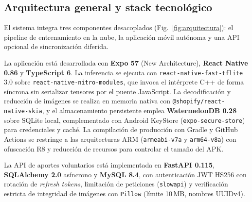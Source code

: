 \documentclass[conference,letterpaper]{IEEEtran}
\begin{document}
\subsection{Arquitectura general y stack tecnológico}
El sistema integra tres componentes desacoplados (Fig.~\ref{fig:arquitectura}): el pipeline de entrenamiento en la nube, la aplicación móvil autónoma y una API opcional de sincronización diferida.

La aplicación está desarrollada con \textbf{Expo 57} (New Architecture), \textbf{React Native 0.86} y \textbf{TypeScript 6}. La inferencia se ejecuta con \texttt{react-native-fast-tflite} 3.0 sobre \texttt{react-native-nitro-modules}, que invoca el intérprete C++ de forma síncrona sin serializar tensores por el puente JavaScript. La decodificación y reducción de imágenes se realiza en memoria nativa con \texttt{@shopify/react-native-skia}, y el almacenamiento persistente emplea \textbf{WatermelonDB 0.28} sobre SQLite local, complementado con Android KeyStore (\texttt{expo-secure-store}) para credenciales y caché. La compilación de producción con Gradle y GitHub Actions se restringe a las arquitecturas ARM (\texttt{armeabi-v7a} y \texttt{arm64-v8a}) con ofuscación R8 y reducción de recursos para controlar el tamaño del APK.

La API de aportes voluntarios está implementada en \textbf{FastAPI 0.115}, \textbf{SQLAlchemy 2.0} asíncrono y \textbf{MySQL 8.4}, con autenticación JWT HS256 con rotación de \textit{refresh tokens}, limitación de peticiones (\texttt{slowapi}) y verificación estricta de integridad de imágenes con \texttt{Pillow} (límite 10\,MB, nombres UUIDv4).
\end{document}
